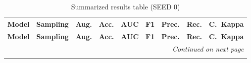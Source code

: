 \documentclass[a4paper,10pt]{book}
\begin{document}
\begin{scriptsize}
\begin{longtable}{@{}l l p{0.5cm} p{1.2cm} p{1.2cm} p{1.2cm} p{1.2cm} p{1.2cm} p{1.2cm}@{}}
\caption{Summarized results table (SEED 0)}\label{tab:avg_metrics_seed_0}\\
\toprule
\textbf{Model} & \textbf{Sampling} & \textbf{Aug.} &
\textbf{Acc.} & \textbf{AUC} & \textbf{F1} &
\textbf{Prec.} & \textbf{Rec.} & \textbf{C.\ Kappa}\\
\midrule
\endfirsthead

\toprule
\textbf{Model} & \textbf{Sampling} & \textbf{Aug.} &
\textbf{Acc.} & \textbf{AUC} & \textbf{F1} &
\textbf{Prec.} & \textbf{Rec.} & \textbf{C.\ Kappa}\\
\midrule
\endhead

\midrule
\multicolumn{9}{r}{\textit{Continued on next page}}\\
\midrule
\endfoot


\end{longtable}
\end{scriptsize}
\end{document}
